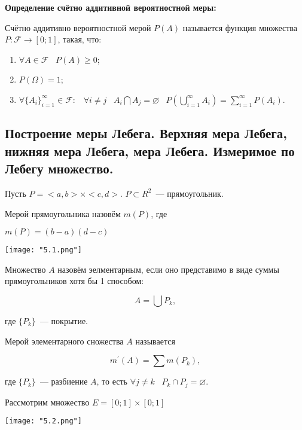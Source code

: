 \textbf{Определение счётно аддитивной 
вероятностной меры:}
    \smallskip

    Счётно аддитивно вероятностной мерой $P(A)$
    называется функция множества $P: \mathcal{F}
    \rightarrow [0; 1]$, такая, что:

    \begin{enumerate}
        \item{$\forall A \in \mathcal{F} \;\;\;
        P(A) \geq 0$;}
        \item{$P(\Omega) = 1$;}
        \item{$\forall \{A_i\}_{i = 1}^{\infty}
        \in \mathcal{F} : \;\;\; \forall
        i \neq j \;\;\; A_i \bigcap A_j = 
        \varnothing \;\;\; P\left(\bigcup\limits_{i = 1}^{
        \infty} A_i\right) = \sum_{i = 1}^{\infty}
        P(A_i)$.}
    \end{enumerate}
    \bigskip  

\subsection{Построение меры Лебега. Верхняя мера Лебега, нижняя мера Лебега, мера
Лебега. Измеримое по Лебегу множество.}    

Пусть $P = <a, b> \times <c, d>$. $P \subset R^2$~--- прямоугольник.
\bigskip

Мерой прямоугольника назовём $m(P)$, где

$m(P) = (b - a)(d - c)$

\begin{center}
    \texttt{[image: "5.1.png"]}
\end{center}
\bigskip

Множество $A$ назовём эелментарным, если оно представимо в виде
суммы прямоугольников хотя бы 1 способом:

\[
    A = \bigcup P_k,  
\]

где $\{P_k\}$~--- покрытие.
\bigskip

Мерой элементарного сножества $A$ называется 

\[
    m^{'}(A) = \sum m(P_k),  
\]

где $\{P_k\}$~--- разбиение $A$, то есть $\forall j \neq k \;\;\; P_k \cap P_j =
\varnothing$.
\bigskip

Рассмотрим множество $E = [0; 1] \times [0; 1]$

\begin{center}
    \texttt{[image: "5.2.png"]}
\end{center}
\bigskip

